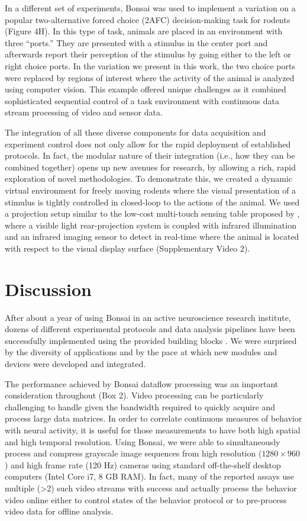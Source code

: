 In a different set of experiments, Bonsai was used to implement a variation on a popular two-alternative forced choice (2AFC) decision-making task for rodents (Figure 4H). In this type of task, animals are placed in an environment with three “ports.” They are presented with a stimulus in the center port and afterwards report their perception of the stimulus by going either to the left or right choice ports. In the variation we present in this work, the two choice ports were replaced by regions of interest where the activity of the animal is analyzed using computer vision. This example offered unique challenges as it combined sophisticated sequential control of a task environment with continuous data stream processing of video and sensor data.

The integration of all these diverse components for data acquisition and experiment control does not only allow for the rapid deployment of established protocols. In fact, the modular nature of their integration (i.e., how they can be combined together) opens up new avenues for research, by allowing a rich, rapid exploration of novel methodologies. To demonstrate this, we created a dynamic virtual environment for freely moving rodents where the visual presentation of a stimulus is tightly controlled in closed-loop to the actions of the animal. We used a projection setup similar to the low-cost multi-touch sensing table proposed by \cite{Han2005}, where a visible light rear-projection system is coupled with infrared illumination and an infrared imaging sensor to detect in real-time where the animal is located with respect to the visual display surface (Supplementary Video 2).

\section{Discussion}

After about a year of using Bonsai in an active neuroscience research institute, dozens of different experimental protocols and data analysis pipelines have been successfully implemented using the provided building blocks \cite{Gouvea2014, Itskov2014, Tecuapetla2014}. We were surprised by the diversity of applications and by the pace at which new modules and devices were developed and integrated.

The performance achieved by Bonsai dataflow processing was an important consideration throughout (Box 2). Video processing can be particularly challenging to handle given the bandwidth required to quickly acquire and process large data matrices. In order to correlate continuous measures of behavior with neural activity, it is useful for those measurements to have both high spatial and high temporal resolution. Using Bonsai, we were able to simultaneously process and compress grayscale image sequences from high resolution ($1280 \times 960$) and high frame rate (120 Hz) cameras using standard off-the-shelf desktop computers (Intel Core i7, 8 GB RAM). In fact, many of the reported assays use multiple (>2) such video streams with success and actually process the behavior video online either to control states of the behavior protocol or to pre-process video data for offline analysis.

